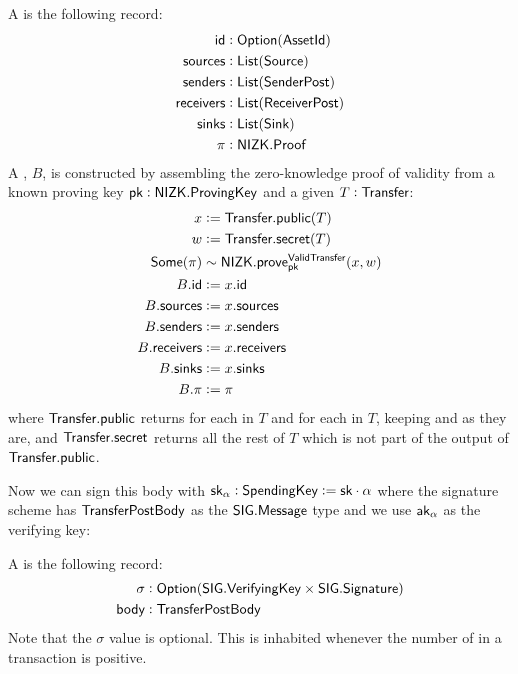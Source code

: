 \begin{definition}
    A \TransferPostBody{} is the following record:
    \begin{align*}
        {\textsf{id}}        &: {\textsf{Option}}({\textsf{AssetId}}) \\
        {\textsf{sources}}   &: {\textsf{List}}({\textsf{Source}}) \\
        {\textsf{senders}}   &: {\textsf{List}}({\textsf{SenderPost}}) \\
        {\textsf{receivers}} &: {\textsf{List}}({\textsf{ReceiverPost}}) \\
        {\textsf{sinks}}     &: {\textsf{List}}({\textsf{Sink}}) \\
        \pi        &: {\textsf{NIZK}}.{\textsf{Proof}} 
    \end{align*}
    A \TransferPostBody{}, $B$, is constructed by assembling the zero-knowledge proof of \Transfer{} validity from a known proving key ${\textsf{pk}} : {\textsf{NIZK}}.{\textsf{ProvingKey}}$ and a given $T : {\textsf{Transfer}}$:
   \begin{align*}
        x            &:= {\textsf{Transfer}}.{\textsf{public}}(T) \\
        w            &:= {\textsf{Transfer}}.{\textsf{secret}}(T) \\
        {\textsf{Some}}(\pi)   &\sim {\textsf{NIZK}}.{\textsf{prove}}^{\textsf{ValidTransfer}}_{\textsf{pk}}(x, w) \\
        B.{\textsf{id}}        &:= x.{\textsf{id}} \\
        B.{\textsf{sources}}   &:= x.{\textsf{sources}} \\
        B.{\textsf{senders}}   &:= x.{\textsf{senders}} \\
        B.{\textsf{receivers}} &:= x.{\textsf{receivers}} \\
        B.{\textsf{sinks}}     &:= x.{\textsf{sinks}} \\
        B.\pi        &:= \pi
    \end{align*}
    where ${\textsf{Transfer}}.{\textsf{public}}$ returns  for each \Sender{} in $T$ and  for each \Receiver{} in $T$, keeping  and  as they are, and ${\textsf{Transfer}}.{\textsf{secret}}$ returns all the rest of $T$ which is not part of the output of ${\textsf{Transfer}}.{\textsf{public}}$.
\end{definition}

Now we can sign this body with ${\textsf{sk}}_\alpha : {\textsf{SpendingKey}} := {\textsf{sk}} \cdot \alpha$ where the signature scheme has ${\textsf{TransferPostBody}}$ as the ${\textsf{SIG}}.{\textsf{Message}}$ type and we use ${\textsf{ak}}_\alpha$ as the verifying key:

\begin{definition}
    A \TransferPost{} is the following record:
    \begin{align*}
        \sigma &: {\textsf{Option}}({\textsf{SIG}}.{\textsf{VerifyingKey}} \times {\textsf{SIG}}.{\textsf{Signature}}) \\
        {\textsf{body}}  &: {\textsf{TransferPostBody}}
    \end{align*}
    Note that the $\sigma$ value is optional. This is inhabited whenever the number of  in a transaction is positive.
\end{definition}

